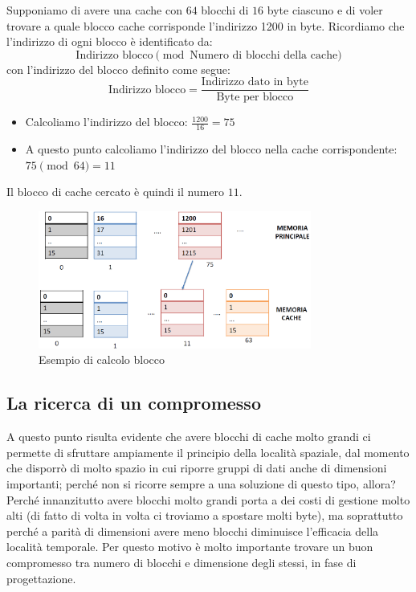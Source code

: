 \documentclass[class=book, crop=false, oneside]{standalone}
\begin{document}
Supponiamo di avere una cache con \(64\) blocchi di \(16\) byte ciascuno e di voler trovare a quale blocco cache corrisponde l'indirizzo 1200 in byte. Ricordiamo che l'indirizzo di ogni blocco è identificato da:
\begin{equation*}
	\textrm{Indirizzo blocco}\pmod{\textrm{Numero di blocchi della cache}}
\end{equation*}
con l'indirizzo del blocco definito come segue:
\begin{equation*}
	\textrm{Indirizzo blocco}=\frac{\textrm{Indirizzo dato in byte}}{\textrm{Byte per blocco}}
\end{equation*}
\begin{itemize}
	\item Calcoliamo l'indirizzo del blocco: \(\frac{1200}{16}=75\)
	\item A questo punto calcoliamo l'indirizzo del blocco nella cache corrispondente: \(75\pmod{64}=11\)
\end{itemize}
Il blocco di cache cercato è quindi il numero \(11\).

\begin{figure}[H]
	\centering
	\includegraphics[width=0.8\textwidth,keepaspectratio]{addressex.png}
	\caption{Esempio di calcolo blocco}
\end{figure}

\subsection{La ricerca di un compromesso}
A questo punto risulta evidente che avere blocchi di cache molto grandi ci permette di sfruttare ampiamente il principio della località spaziale, dal momento che disporrò di molto spazio in cui riporre gruppi di dati anche di dimensioni importanti; perché non si ricorre sempre a una soluzione di questo tipo, allora? Perché innanzitutto avere blocchi molto grandi porta a dei costi di gestione molto alti (di fatto di volta in volta ci troviamo a spostare molti byte), ma soprattutto perché a parità di dimensioni avere meno blocchi diminuisce l'efficacia della località temporale. Per questo motivo è molto importante trovare un buon compromesso tra numero di blocchi e dimensione degli stessi, in fase di progettazione.
\end{document}
